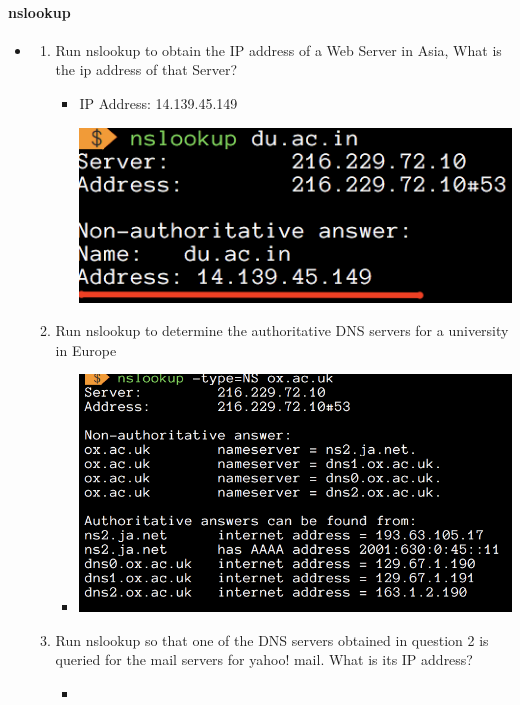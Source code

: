 \documentclass{article}
\begin{document}
\paragraph{nslookup}
\begin{itemize}
  \item\begin{enumerate}
    \item Run nslookup to obtain the IP address of a Web Server in Asia, What is the ip address of that Server?
      \begin{itemize}
        \item IP Address: 14.139.45.149 \par
        \includegraphics[scale=0.8]{images/nslook1.png}
      \end{itemize}
    \item Run nslookup to determine the authoritative DNS servers for a university in Europe
        \begin{itemize}
          \item \includegraphics[scale=0.6]{images/nslookup2.png}
        \end{itemize}

    \item Run nslookup so that one of the DNS servers obtained in question 2 is queried for the mail servers for yahoo! mail.  What is its IP address?
        \begin{itemize}
          \item 
        \end{itemize}
  \end{enumerate}
\end{itemize}
\end{document}
